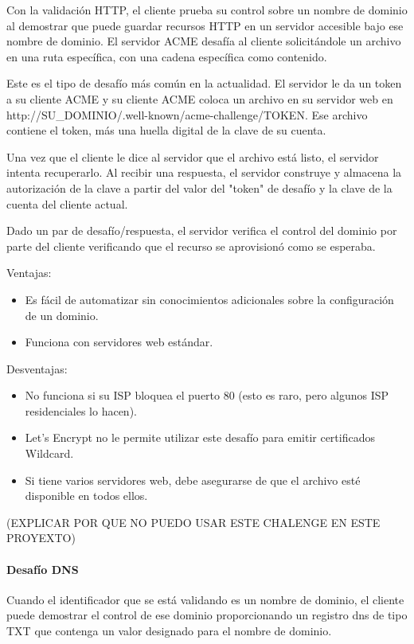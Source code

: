 Con la validación HTTP, el cliente prueba su control sobre un nombre de dominio al 
demostrar que puede guardar recursos HTTP en un servidor accesible bajo ese nombre 
de dominio. El servidor ACME desafía al cliente solicitándole un archivo en una ruta 
específica, con una cadena específica como contenido.

Este es el tipo de desafío más común en la actualidad. El servidor le da un token 
a su cliente ACME y su cliente ACME coloca un archivo en su servidor web 
en {http://\<SU\_DOMINIO\>/.well-known/acme-challenge/\<TOKEN\>}. Ese archivo contiene 
el token, más una huella digital de la clave de su cuenta.

Una vez que el cliente le dice al servidor que el archivo está listo, el servidor 
intenta recuperarlo. Al recibir una respuesta, el servidor construye y almacena la 
autorización de la clave a partir del valor del "token" de desafío y la clave de 
la cuenta del cliente actual.

Dado un par de desafío/respuesta, el servidor verifica el control del dominio por 
parte del cliente verificando que el recurso se aprovisionó como se esperaba.

Ventajas:

\begin{itemize}
   \item Es fácil de automatizar sin conocimientos adicionales sobre la configuración de un dominio.
   \item Funciona con servidores web estándar.
\end{itemize}

Desventajas:
\begin{itemize}
   \item No funciona si su ISP bloquea el puerto 80 (esto es raro, pero algunos ISP residenciales lo hacen).
   \item Let's Encrypt no le permite utilizar este desafío para emitir certificados Wildcard.
   \item Si tiene varios servidores web, debe asegurarse de que el archivo esté disponible en todos ellos.
\end{itemize}
   
(EXPLICAR POR QUE NO PUEDO USAR ESTE CHALENGE EN ESTE PROYEXTO)


\paragraph*{Desafío DNS}
Cuando el identificador que se está validando es un nombre de dominio, el cliente 
puede demostrar el control de ese dominio proporcionando un registro dns de tipo 
TXT que contenga un valor designado para el nombre de dominio.

